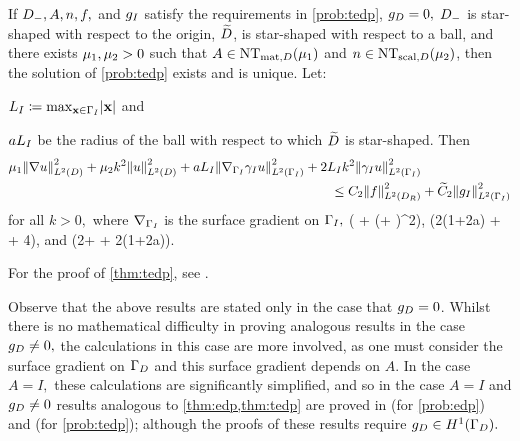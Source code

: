 \label{thm:tedp}
If $D_{-}, A, n, f,$ and $g_{I}$ satisfy the requirements in \cref{prob:tedp}, $g_{D} = 0,$ $D_{-}$ is star-shaped with respect to the origin, $\widetilde{D}$, is star-shaped with respect to a ball, and there exists $\mu_{1}, \mu_{2} > 0$ such that $A \in \NTAD{\muo}$ and $n \in \NTnD{\mut}$, then the solution of \cref{prob:tedp} exists and is unique. Let:
\bit
\item $\LI \de \max_{\bx \in \GI} \abs{\bx}$ and
\item $aL_{I}$ be the radius of the ball with respect to which $\widetilde{D}$ is star-shaped.
    \eit
Then
\begin{align}
  \muo \NLtD{\grad u}^2 + \mut k^2 \NLtD{u}^2 + a\LI\NLtGI{\gradGI \trGI u}^2& + 2\LI k^2 \NLtGI{\trGI u}^2\nonumber\\
&\quad\quad  \leq \Ct \NLtDR{f}^2 + \Cttilde \NLtGI{\gI}^2\label{eq:tedpbound}
\end{align}
for all $k>0,$ where $\nabla_{\Gamma_{I}}$ is the surface gradient on $\Gamma_{I},$
\beqs
\Ct {}\mleft( + \mleft(\beta + \mright)^2\mright),
\eeqs
\beqs
\Cttilde {}\mleft(2\mleft(1+\frac2a\mright) + \frac\beta{\LI} + 4\mright)\LI,
\eeqs
and
\beqs
\beta \de \LI \mleft(2+ + 2\mleft(1+\frac2a\mright)\mright).
\eeqs
\enth

For the proof of \cref{thm:tedp}, see \cite[Theorem A.6 (i)]{GrPeSp:19}.

Observe that the above results are stated only in the case that $g_{D} = 0$. Whilst there is no mathematical difficulty in proving analogous results in the case $g_{D} \neq 0,$ the calculations in this case are more involved, as one must consider the surface gradient on $\Gamma_{D}$  and this surface gradient depends on $A.$ In the case $A=I,$ these calculations are significantly simplified, and so in the case $A=I$ and $g_{D} \neq 0$ results analogous to \cref{thm:edp,thm:tedp} are proved in \cite[Theorem 2.19(ii)]{GrPeSp:19} (for \cref{prob:edp}) and \cite[Theorem A.6(iv)]{GrPeSp:19} (for \cref{prob:tedp}); although the proofs of these results require $\gD \in \HoGD.$


